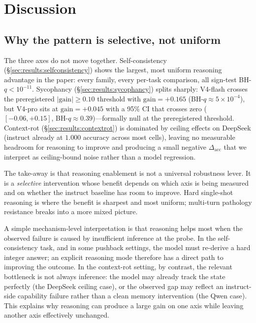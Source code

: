 \section{Discussion}
\label{sec:discussion}

\subsection{Why the pattern is selective, not uniform}
\label{sec:discussion:selective}

The three axes do not move together. Self-consistency
(\S\ref{sec:results:selfconsistency}) shows the largest, most uniform
reasoning advantage in the paper: every family, every per-task
comparison, all sign-test BH-$q < 10^{-11}$. Sycophancy
(\S\ref{sec:results:sycophancy}) splits sharply: V4-flash crosses the
preregistered $|\mathrm{gain}|\geq 0.10$ threshold with
$\mathrm{gain}{=}{+}0.165$ (BH-$q \approx 5{\times}10^{-4}$), but V4-pro
sits at $\mathrm{gain}{=}{+}0.045$ with a 95\% CI that crosses zero
($[-0.06, +0.15]$, BH-$q \approx 0.39$)---formally null at the
preregistered threshold. Context-rot
(\S\ref{sec:results:contextrot}) is dominated by ceiling effects on
DeepSeek (instruct already at $1.000$ accuracy across most cells),
leaving no measurable headroom for reasoning to improve and producing
a small negative $\Delta_{\mathrm{acc}}$ that we interpret as
ceiling-bound noise rather than a model regression.

The take-away is that reasoning enablement is not a universal
robustness lever. It is a \emph{selective} intervention whose benefit
depends on which axis is being measured and on whether the instruct
baseline has room to improve. Hard single-shot reasoning is where the
benefit is sharpest and most uniform; multi-turn pathology
resistance breaks into a more mixed picture.

A simple mechanism-level interpretation is that reasoning helps most
when the observed failure is caused by insufficient inference at the
probe. In the self-consistency task, and in some pushback settings, the
model must re-derive a hard integer answer; an explicit reasoning mode
therefore has a direct path to improving the outcome. In the context-rot
setting, by contrast, the relevant bottleneck is not always inference:
the model may already track the state perfectly (the DeepSeek ceiling
case), or the observed gap may reflect an instruct-side capability
failure rather than a clean memory intervention (the Qwen case). This
explains why reasoning can produce a large gain on one axis while
leaving another axis effectively unchanged.

